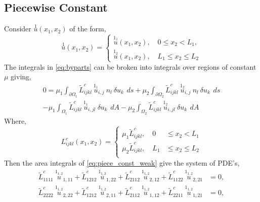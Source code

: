 \documentclass[11pt]{report}
\begin{document}
\begin{appendices}
\section{Piecewise Constant}
Consider $\overset{1}{u}(x_1, x_2)$ of the form,
\begin{equation}
\overset{1}{u}(x_1, x_2) = \left \{ 
\begin{aligned}
\overset{1_1}{u}(x_1, x_2),  \quad 0 \leq x_2 < L_1,  \\
\overset{1_2}{u}(x_1, x_2),  \quad L_1 \leq x_2 \leq L_2
\end{aligned}
\right. 
\end{equation}
The integrals in \eqref{eq:byparts} can be broken into integrals over regions of constant $\mu$ giving,
\begin{equation} \label{eq:piece_const_weak}
\begin{gathered}
0 = \mu_1 \int_{\partial \Omega_1} \tilde{L}^c_{ijkl} \: \overset{1_1}{u}_{i,j} \: n_l \:  \delta u_k \: \,ds +  \mu_2 \int_{\partial \Omega_2} \tilde{L}^c_{ijkl} \: \overset{1_2}{u}_{i,j} \: n_l \:  \delta u_k \: \,ds \\
- \mu_1 \int_{\Omega_1} \tilde{L}^c_{ijkl} \: \overset{1_1}{u}_{i,jl} \: \delta u_k \: \,dA - \mu_2 \int_{\Omega_2}  \tilde{L}^c_{ijkl} \: \overset{1_2}{u}_{i,jl} \: \delta u_k \: \,dA
\end{gathered}
\end{equation}
Where,
\begin{equation}
L^c_{ijkl}(x_1, x_2) =
\left \{
\begin{aligned}
  \mu_1 \tilde{L}^c_{ijkl} , \quad  0 &\leq x_2 < L_1 \\
  \mu_2 \tilde{L}^c_{ijkl} , \quad  L_1 &\leq x_2 \leq L_2\\
\end{aligned}
\right.
\end{equation}
Then the area integrals of \eqref{eq:piece_const_weak} give the system of PDE's,
\begin{equation} \label{eq:piece_const_PDE_system}
\begin{aligned}
 \tilde{L}^{c}_{1111} \: \overset{1_{1,2}}{u}_{1,11} + \tilde{L}^{c}_{1212} \: \overset{1_{1,2}}{u}_{1,22}+ \tilde{L}^{c}_{2112} \: \overset{1_{1,2}}{u}_{2,12}  + \tilde{L}^{c}_{1122} \: \overset{1_{1,2}}{u}_{2,21} &= 0,\\
 \tilde{L}^{c}_{2222} \: \overset{1_{1,2}}{u}_{2,22}+ \tilde{L}^{c}_{1212} \: \overset{1_{1,2}}{u}_{2,11}+ \tilde{L}^{c}_{2112} \: \overset{1_{1,2}}{u}_{1,12}  + \tilde{L}^{c}_{2211} \: \overset{1_{1,2}}{u}_{1,21} &= 0,

\end{aligned}
\end{equation}
\end{appendices}
\end{document}
